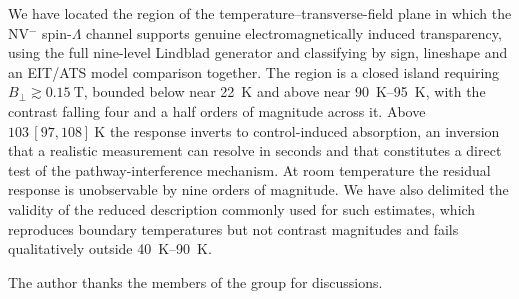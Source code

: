 \documentclass[
  reprint,
  amsmath,amssymb,
  aps,pra,
  superscriptaddress,
  floatfix,
]{revtex4-2}
\newcommand{\Bperp}{B_{\perp}}
\begin{document}
We have located the region of the temperature--transverse-field plane in
which the NV$^{-}$ spin-$\Lambda$ channel supports genuine electromagnetically
induced transparency, using the full nine-level Lindblad generator and
classifying by sign, lineshape and an EIT/ATS model comparison together. The
region is a closed island requiring $\Bperp\gtrsim\SI{0.15}{\tesla}$, bounded
below near \SI{22}{\kelvin} and above near \SI{90}{\kelvin}--\SI{95}{\kelvin},
with the contrast falling four and a half orders of magnitude across it. Above
$103\,[97,108]~\si{\kelvin}$ the response inverts to control-induced
absorption, an inversion that a realistic measurement can resolve in seconds
and that constitutes a direct test of the pathway-interference mechanism. At
room temperature the residual response is unobservable by nine orders of
magnitude. We have also delimited the validity of the reduced description
commonly used for such estimates, which reproduces boundary temperatures but
not contrast magnitudes and fails qualitatively outside
\SI{40}{\kelvin}--\SI{90}{\kelvin}.

\begin{acknowledgments}
The author thanks the members of the group for discussions.
\end{acknowledgments}

\makeatletter
\expandafter\gdef\csname b@apsrev42Control\endcsname{}
\makeatother
\nocite{apsrev42Control}


\end{document}
